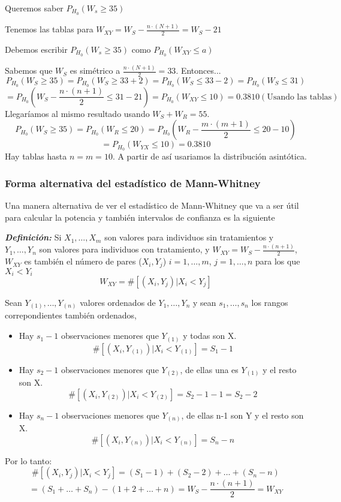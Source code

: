 \noindent Queremos saber $P_{H_0}(W_s \geq 35)$

\noindent Tenemos las tablas para $W_{XY}=W_S-\frac{n \cdot (N+1)}{2}=W_S-21$

\noindent Debemos escribir $P_{H_0}(W_s \geq 35)$ como $P_{H_0}(W_{XY} \leq a)$

\noindent Sabemos que $W_S$ es simétrico a $\frac{n \cdot (N+1)}{2}=33$. Entonces...
\[
    P_{H_0}(W_S \geq 35)= P_{H_0}(W_S \geq 33+2)=P_{H_0}(W_S \leq 33-2)=P_{H_0}(W_S \leq 31)
\]
\[
    =P_{H_0}\left(W_S-\frac{n \cdot (n+1)}{2} \leq 31-21\right)= P_{H_0} (W_{XY} \leq 10)=0.3810 (\text{Usando las tablas})
\]
Llegaríamos al mismo resultado usando $W_S+W_R=55$.
\[
    P_{H_0}(W_S \geq 35)= P_{H_0}(W_R \leq 20)= P_{H_0} \left( W_R - \frac{m \cdot (m+1)}{2} \leq 20-10\right)
\]
\[
    = P_{H_0} (W_{YX} \leq 10)=0.3810
\]
Hay tablas hasta $n=m=10$. A partir de así usariamos la distribución asintótica.

\subsubsection{Forma alternativa del estadístico de Mann-Whitney}

Una manera alternativa de ver el estadístico de Mann-Whitney que va a ser útil para calcular la potencia y también intervalos de confianza es la siguiente

\textit{\textbf{Definición: }} Si $X_1,\dots,X_m$ son valores para individuos sin tratamientos y $Y_1,\dots,Y_n$ son valores para individuos con tratamiento,
y $W_{XY}=W_S-\frac{n \cdot (n+1)}{2}$, $W_{XY}$ es también el número de pares ($X_i,Y_j$) $i=1,\dots,m$, $j=1,\dots,n$ para los que $X_i < Y_i$
\[
    W_{XY}= \# [(X_i,Y_j) | X_i <Y_j]
\]

\begin{proofs}
    Sean $Y_{(1)}, \dots, Y_{(n)}$ valores ordenados de $Y_1,\dots,Y_n$ y sean $s_1,\dots,s_n$ los rangos correpondientes también ordenados,
    \begin{itemize}
        \item Hay $s_1-1$ observaciones menores que $Y_{(1)}$ y todas son X.
        \[
            \# [(X_i,Y_{(1)}) | X_i <Y_{(1)}]=S_1-1
        \]
        \item Hay $s_2-1$ observaciones menores que $Y_{(2)}$, de ellas una es $Y_{(1)}$ y el resto son X.
        \[
            \# [(X_i,Y_{(2)}) | X_i <Y_{(2)}]=S_2-1-1=S_2-2
        \]
        \item Hay $s_n-1$ observaciones menores que $Y_{(n)}$, de ellas n-1 son Y y el resto son X.
        \[
            \# [(X_i,Y_{(n)}) | X_i <Y_{(n)}]=S_n-n
        \]
    \end{itemize} 
    Por lo tanto:
    \[
        \# [(X_i,Y_j) | X_i <Y_j]=(S_1-1)+(S_2-2)+ \dots +(S_n-n)
    \]
    \[    
        =(S_1+\dots+S_n)-(1+2+\dots+n)=W_S-\frac{n \cdot (n+1)}{2}=W_{XY}
    \]
\end{proofs}

